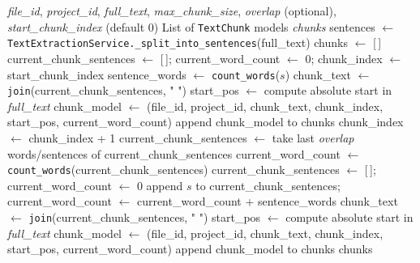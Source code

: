 \begin{algorithm}[H]
\caption{ChunkTextAndCreateChunks}
\small\begin{algorithmic}[1]
\Require \textit{file\_id}, \textit{project\_id}, \textit{full\_text}, \textit{max\_chunk\_size}, \textit{overlap} (optional), \textit{start\_chunk\_index} (default 0)
\Ensure List of \texttt{TextChunk} models \textit{chunks}
\State sentences $\leftarrow$ \texttt{TextExtractionService.\_split\_into\_sentences}(full\_text)
\State chunks $\leftarrow$ [\,]
\State current\_chunk\_sentences $\leftarrow$ [\,];\; current\_word\_count $\leftarrow$ 0;\; chunk\_index $\leftarrow$ start\_chunk\_index
    \State sentence\_words $\leftarrow$ \texttt{count\_words}($s$)
        \State chunk\_text $\leftarrow$ \texttt{join}(current\_chunk\_sentences, " ")
        \State start\_pos $\leftarrow$ compute absolute start in \textit{full\_text}
        \State chunk\_model $\leftarrow$ \texttt{}(file\_id,
        \Statex \hspace{4em} project\_id, chunk\_text, chunk\_index, start\_pos, current\_word\_count)
        \State append chunk\_model to chunks
        \State chunk\_index $\leftarrow$ chunk\_index + 1
            \State current\_chunk\_sentences $\leftarrow$ take last \textit{overlap} words/sentences of current\_chunk\_sentences
            \State current\_word\_count $\leftarrow$ \texttt{count\_words}(current\_chunk\_sentences)
        \Else
            \State current\_chunk\_sentences $\leftarrow$ [\,];\; current\_word\_count $\leftarrow$ 0
        \EndIf
    \EndIf
    \State append $s$ to current\_chunk\_sentences;\; current\_word\_count $\leftarrow$ current\_word\_count + sentence\_words
\EndFor
{}
    \State chunk\_text $\leftarrow$ \texttt{join}(current\_chunk\_sentences, " ")
    \State start\_pos $\leftarrow$ compute absolute start in \textit{full\_text}
    \State chunk\_model $\leftarrow$ \texttt{}(file\_id,
    \Statex \hspace{4em} project\_id, chunk\_text, chunk\_index, start\_pos, current\_word\_count)
    \State append chunk\_model to chunks
\EndIf
\State \Return chunks
\end{algorithmic}\normalsize
\end{algorithm}
\FloatBarrier

